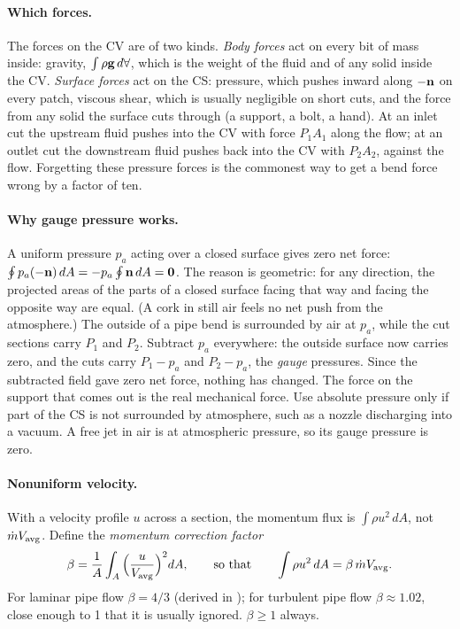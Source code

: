 \paragraph{Which forces.} The forces on the CV are of two kinds. \emph{Body forces} act on every bit of mass inside: gravity, $\int\rho\mathbf{g}\,d\forall$, which is the weight of the fluid and of any solid inside the CV. \emph{Surface forces} act on the CS: pressure, which pushes inward along $-\mathbf{n}$ on every patch, viscous shear, which is usually negligible on short cuts, and the force from any solid the surface cuts through (a support, a bolt, a hand). At an inlet cut the upstream fluid pushes into the CV with force $P_1A_1$ along the flow; at an outlet cut the downstream fluid pushes back into the CV with $P_2A_2$, against the flow. Forgetting these pressure forces is the commonest way to get a bend force wrong by a factor of ten.

\paragraph{Why gauge pressure works.} A uniform pressure $p_a$ acting over a closed surface gives zero net force: $\oint p_a(-\mathbf{n})\,dA = -p_a\oint\mathbf{n}\,dA = \mathbf{0}$. The reason is geometric: for any direction, the projected areas of the parts of a closed surface facing that way and facing the opposite way are equal. (A cork in still air feels no net push from the atmosphere.) The outside of a pipe bend is surrounded by air at $p_a$, while the cut sections carry $P_1$ and $P_2$. Subtract $p_a$ everywhere: the outside surface now carries zero, and the cuts carry $P_1 - p_a$ and $P_2 - p_a$, the \emph{gauge} pressures. Since the subtracted field gave zero net force, nothing has changed. The force on the support that comes out is the real mechanical force. Use absolute pressure only if part of the CS is not surrounded by atmosphere, such as a nozzle discharging into a vacuum. A free jet in air is at atmospheric pressure, so its gauge pressure is zero.

\paragraph{Nonuniform velocity.} With a velocity profile $u$ across a section, the momentum flux is $\int\rho u^2\,dA$, not $\dot m V_\text{avg}$. Define the \emph{momentum correction factor}
\[
\beta = \frac{1}{A}\int_A\Big(\frac{u}{V_\text{avg}}\Big)^2 dA, \qquad\text{so that}\qquad \int\rho u^2\,dA = \beta\,\dot m V_\text{avg}.
\]
For laminar pipe flow $\beta = 4/3$ (derived in ); for turbulent pipe flow $\beta \approx 1.02$, close enough to 1 that it is usually ignored. $\beta \ge 1$ always.

